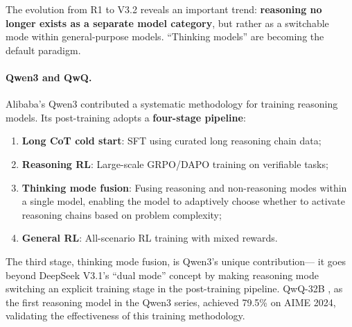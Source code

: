 \noindent
The evolution from R1 to V3.2 reveals an important trend:
\textbf{reasoning no longer exists as a separate model category},
but rather as a switchable mode within general-purpose models.
``Thinking models'' are becoming the default paradigm.

\paragraph{Qwen3 and QwQ.}
Alibaba's Qwen3 \cite{yang2025qwen3} contributed a systematic methodology for training reasoning models.
Its post-training adopts a \textbf{four-stage pipeline}:
\begin{enumerate}[leftmargin=2em]
  \item \textbf{Long CoT cold start}: SFT using curated long reasoning chain data;
  \item \textbf{Reasoning RL}: Large-scale GRPO/DAPO training on verifiable tasks;
  \item \textbf{Thinking mode fusion}: Fusing reasoning and non-reasoning modes within a single model,
    enabling the model to adaptively choose whether to activate reasoning chains based on problem complexity;
  \item \textbf{General RL}: All-scenario RL training with mixed rewards.
\end{enumerate}
The third stage, thinking mode fusion, is Qwen3's unique contribution---
it goes beyond DeepSeek V3.1's ``dual mode'' concept
by making reasoning mode switching an explicit training stage in the post-training pipeline.
QwQ-32B \cite{qwen2025qwq}, as the first reasoning model in the Qwen3 series,
achieved 79.5\% on AIME 2024, validating the effectiveness of this training methodology.

